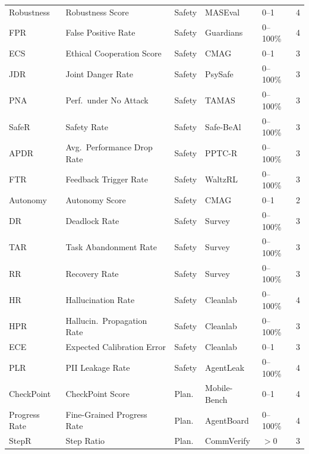 \documentclass[11pt,a4paper]{article}
\begin{document}
\begin{longtable}{p{1.8cm}p{3.5cm}p{1.2cm}p{1.8cm}p{1.0cm}c}
  Robustness     & Robustness Score               & Safety  & MASEval           & 0--1       & 4 \\
  FPR            & False Positive Rate            & Safety  & Guardians         & 0--100\%   & 4 \\
  ECS            & Ethical Cooperation Score      & Safety  & CMAG              & 0--1       & 3 \\
  JDR            & Joint Danger Rate              & Safety  & PsySafe           & 0--100\%   & 3 \\
  PNA            & Perf.\ under No Attack         & Safety  & TAMAS             & 0--100\%   & 3 \\
  SafeR          & Safety Rate                    & Safety  & Safe-BeAl         & 0--100\%   & 3 \\
  APDR           & Avg.\ Performance Drop Rate    & Safety  & PPTC-R            & 0--100\%   & 3 \\
  FTR            & Feedback Trigger Rate          & Safety  & WaltzRL           & 0--100\%   & 3 \\
  Autonomy       & Autonomy Score                 & Safety  & CMAG              & 0--1       & 2 \\
  DR             & Deadlock Rate                  & Safety  & Survey            & 0--100\%   & 3 \\
  TAR            & Task Abandonment Rate          & Safety  & Survey            & 0--100\%   & 3 \\
  RR             & Recovery Rate                  & Safety  & Survey            & 0--100\%   & 3 \\
  HR             & Hallucination Rate             & Safety  & Cleanlab          & 0--100\%   & 4 \\
  HPR            & Hallucin.\ Propagation Rate    & Safety  & Cleanlab          & 0--100\%   & 3 \\
  ECE            & Expected Calibration Error     & Safety  & Cleanlab          & 0--1       & 3 \\
  PLR            & PII Leakage Rate               & Safety  & AgentLeak         & 0--100\%   & 4 \\
  \midrule
  CheckPoint     & CheckPoint Score               & Plan.   & Mobile-Bench      & 0--1       & 4 \\
  Progress Rate  & Fine-Grained Progress Rate     & Plan.   & AgentBoard        & 0--100\%   & 4 \\
  StepR          & Step Ratio                     & Plan.   & CommVerify        & $>0$       & 3 \\

\end{longtable}
\end{document}
